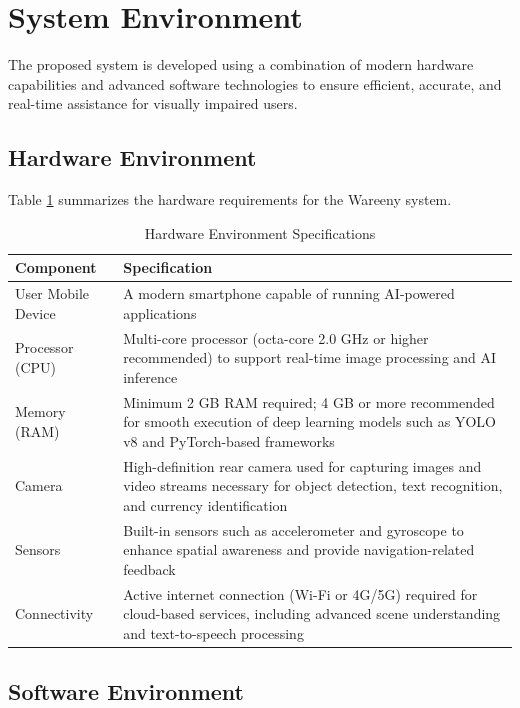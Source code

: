 \documentclass[a4paper]{report}
\begin{document}
\section{System Environment}
\label{sec:system-environment}

The proposed system is developed using a combination of modern hardware capabilities and advanced software technologies to ensure efficient, accurate, and real-time assistance for visually impaired users.

\subsection{Hardware Environment}

Table \ref{tab:hardware-env} summarizes the hardware requirements for the Wareeny system.

\begin{table}[H]
\centering
\caption{Hardware Environment Specifications}
\label{tab:hardware-env}
\small
\begin{tabular}{@{}p{4cm}p{10cm}@{}}
\toprule
\textbf{Component} & \textbf{Specification} \\
\midrule
User Mobile Device & A modern smartphone capable of running AI-powered applications \\
\midrule
Processor (CPU) & Multi-core processor (octa-core 2.0 GHz or higher recommended) to support real-time image processing and AI inference \\
\midrule
Memory (RAM) & Minimum 2 GB RAM required; 4 GB or more recommended for smooth execution of deep learning models such as YOLO v8 and PyTorch-based frameworks \\
\midrule
Camera & High-definition rear camera used for capturing images and video streams necessary for object detection, text recognition, and currency identification \\
\midrule
Sensors & Built-in sensors such as accelerometer and gyroscope to enhance spatial awareness and provide navigation-related feedback \\
\midrule
Connectivity & Active internet connection (Wi-Fi or 4G/5G) required for cloud-based services, including advanced scene understanding and text-to-speech processing \\
\bottomrule
\end{tabular}
\end{table}

\subsection{Software Environment}
\end{document}
